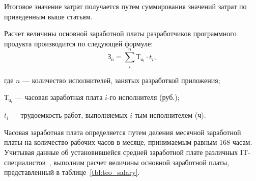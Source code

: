 Итоговое значение затрат получается путем суммирования значений затрат
по приведенным выше статьям.

Расчет величины основной заработной платы разработчиков программного
продукта производится по следующей формуле:
\begin{equation*}
  \text{З}_{\text{о}} =
  \sum^n_i \text{Т}_{\text{ч}_{i}} \cdot t_{i},
\end{equation*}

\noindent где
\( n \)
--- количество исполнителей, занятых разработкой приложения; \par
\noindent \hspace{6.5mm} \( \text{Т}_{\text{ч}_{i}} \)
--- часовая заработная плата \( i \)-го исполнителя (руб.); \par
\noindent \hspace{6.5mm} \( t_i \)
--- трудоемкость работ, выполняемых \( i \)-тым исполнителем (ч).

Часовая заработная плата определяется путем деления месячной
заработной платы на количество рабочих часов в месяце,
принимаемым равным 168 часам.
Учитывая данные об установившейся средней заработной
плате различных IT-специалистов~\cite{dev_by_salaries},
выполним расчет величины основной заработной платы,
представленный в таблице~\ref{tbl:teo_salary}.

